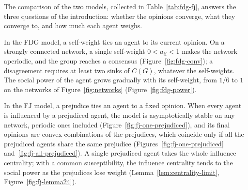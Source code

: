 The comparison of the two models, collected in Table~\ref{tab:fdg-fj}, answers the three
questions of the introduction: whether the opinions converge, what they converge to, and
how much each agent weighs.

In the FDG model, a self-weight ties an agent to its current opinion. On a strongly
connected network, a single self-weight $0 < a_{ii} < 1$ makes the network aperiodic,
and the group reaches a consensus (Figure~\ref{fig:fdg-conv}); a disagreement requires at
least two sinks of $C(G)$, whatever the self-weights. The social power of the agent grows
gradually with its self-weight, from $1/6$ to $1$ on the networks of
Figure~\ref{fig:networks} (Figure~\ref{fig:fdg-power}).

In the FJ model, a prejudice ties an agent to a fixed opinion. When every agent is
influenced by a prejudiced agent, the model is asymptotically stable on any network,
periodic ones included (Figure~\ref{fig:fj-one-prejudiced}), and its final opinions are
convex combinations of the prejudices, which coincide only if all the prejudiced agents
share the same prejudice (Figures~\ref{fig:fj-one-prejudiced}
and~\ref{fig:fj-all-prejudiced}). A single prejudiced agent takes the whole influence
centrality; with a common susceptibility, the influence centrality tends to the social
power as the prejudices lose weight (Lemma~\ref{lem:centrality-limit},
Figure~\ref{fig:fj-lemma24}).

